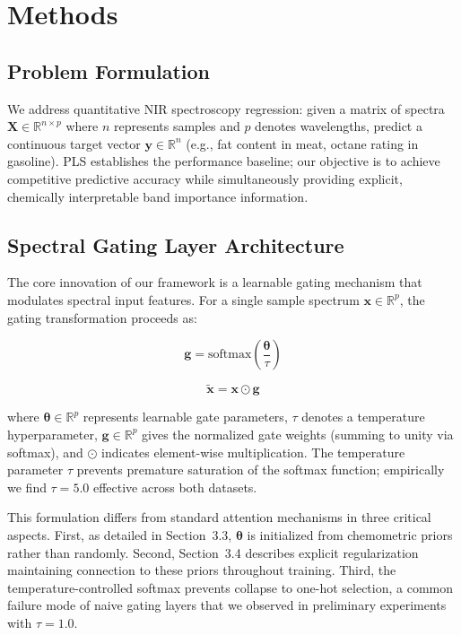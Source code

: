 \documentclass[preprint,12pt]{elsarticle}
\begin{document}
\section{Methods}

\subsection{Problem Formulation}

We address quantitative NIR spectroscopy regression: given a matrix of spectra $\mathbf{X} \in \mathbb{R}^{n \times p}$ where $n$ represents samples and $p$ denotes wavelengths, predict a continuous target vector $\mathbf{y} \in \mathbb{R}^n$ (e.g., fat content in meat, octane rating in gasoline). PLS establishes the performance baseline; our objective is to achieve competitive predictive accuracy while simultaneously providing explicit, chemically interpretable band importance information.

\subsection{Spectral Gating Layer Architecture}

The core innovation of our framework is a learnable gating mechanism that modulates spectral input features. For a single sample spectrum $\mathbf{x} \in \mathbb{R}^p$, the gating transformation proceeds as:

\begin{equation}
\mathbf{g} = \text{softmax}\left(\frac{\boldsymbol{\theta}}{\tau}\right)
\label{eq:softmax}
\end{equation}

\begin{equation}
\tilde{\mathbf{x}} = \mathbf{x} \odot \mathbf{g}
\label{eq:gating}
\end{equation}

\noindent where $\boldsymbol{\theta} \in \mathbb{R}^p$ represents learnable gate parameters, $\tau$ denotes a temperature hyperparameter, $\mathbf{g} \in \mathbb{R}^p$ gives the normalized gate weights (summing to unity via softmax), and $\odot$ indicates element-wise multiplication. The temperature parameter $\tau$ prevents premature saturation of the softmax function; empirically we find $\tau=5.0$ effective across both datasets.

This formulation differs from standard attention mechanisms in three critical aspects. First, as detailed in Section~3.3, $\boldsymbol{\theta}$ is initialized from chemometric priors rather than randomly. Second, Section~3.4 describes explicit regularization maintaining connection to these priors throughout training. Third, the temperature-controlled softmax prevents collapse to one-hot selection, a common failure mode of naive gating layers that we observed in preliminary experiments with $\tau=1.0$.
\end{document}
